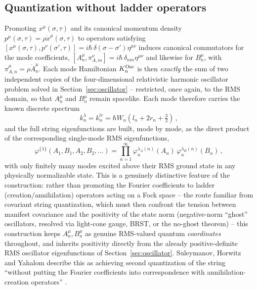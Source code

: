 \documentclass[11pt]{article}
\begin{document}
\subsection{Quantization without ladder operators}
\label{sec:quantization}

Promoting $x^\mu(\sigma,\tau)$ and its canonical momentum density
$p^\mu(\sigma,\tau)=\rho\dot x^\mu(\sigma,\tau)$ to operators satisfying
$[x^\mu(\sigma,\tau),p^\nu(\sigma',\tau)]=i\hbar\,\delta(\sigma-\sigma')\eta^{\mu\nu}$
induces canonical commutators for the mode coefficients,
$[A_n^\mu,\pi_{A,m}^\nu]=i\hbar\,\delta_{nm}\eta^{\mu\nu}$ and likewise for
$B_n^\mu$, with $\pi_{A,n}^\mu=\rho\dot A_n^\mu$. Each mode Hamiltonian
$K_n^{\rm Osc}$ is then \emph{exactly} the sum of two independent copies of the
four-dimensional relativistic harmonic oscillator problem solved in
Section~\ref{sec:oscillator} -- restricted, once again, to the RMS domain, so
that $A_n^\mu$ and $B_n^\mu$ remain spacelike. Each mode therefore carries the
known discrete spectrum
\begin{equation}
k_n^\lambda=k_n^{lr}=\hbar W_n\left(l_n+2r_n+\tfrac32\right)\,,
\label{eq:modespectrum}
\end{equation}
and the full string eigenfunctions are built, mode by mode, as the direct
product of the corresponding single-mode RMS eigenfunctions,
\begin{equation}
\varphi^{\{\lambda\}}(A_1,B_1,A_2,B_2,\dots)=\prod_{n=1}^\infty
\varphi_n^{\lambda_A(n)}(A_n)\,\varphi_n^{\lambda_B(n)}(B_n)\,,
\label{eq:stringwavefunction}
\end{equation}
with only finitely many modes excited above their RMS ground state in any
physically normalizable state. This is a genuinely distinctive feature of the
construction: rather than promoting the Fourier coefficients to ladder
(creation/annihilation) operators acting on a Fock space -- the route familiar
from covariant string quantization, which must then confront the tension
between manifest covariance and the positivity of the state norm (negative-norm
``ghost'' oscillators, resolved via light-cone gauge, BRST, or the no-ghost
theorem) -- this construction keeps $A_n^\mu,B_n^\mu$ as genuine RMS-valued
quantum \emph{coordinates} throughout, and inherits positivity directly from
the already positive-definite RMS oscillator eigenfunctions of
Section~\ref{sec:oscillator}. Suleymanov, Horwitz and Yahalom describe this as
achieving second quantization of the string ``without putting the Fourier
coefficients into correspondence with annihilation-creation operators''
\cite{SuleymanovHorwitzYahalom2017}.
\end{document}
